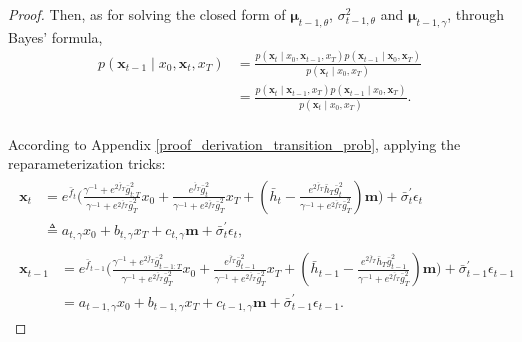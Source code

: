 \begin{proof}
Then, as for solving the closed form of $\boldsymbol{\mu}_{t-1, \theta}$, $\sigma_{t-1, \theta}^2$ and $\boldsymbol{\mu}_{t-1, \gamma}$, through Bayes' formula, 
\begin{equation}
\begin{aligned}
p\left( \mathbf{x}_{t-1}\mid x_0, \mathbf{x}_t, x_T \right)
&=\frac{p(\mathbf{x}_t \mid x_0, \mathbf{x}_{t-1}, x_T) p(\mathbf{x}_{t-1} \mid \mathbf{x}_0, \mathbf{x}_T)}{p(\mathbf{x}_t \mid x_0, x_T)} \\
&= \frac{p(\mathbf{x}_t \mid \mathbf{x}_{t-1}, x_T)p(\mathbf{x}_{t-1} \mid x_0, \mathbf{x}_T)}{p(\mathbf{x}_t \mid x_0, x_T)}.\\
\end{aligned}
\end{equation}

According to Appendix \ref{proof_derivation_transition_prob}, applying the reparameterization tricks:
\begin{equation}
\begin{gathered}
\begin{aligned}
\mathbf{x}_{t} &= e^{\bar{f}_{t}} \Bigg(\frac{\gamma^{-1} + e^{2\bar{f}_{T}} \bar{g}^2_{t:T}}{\gamma^{-1} + e^{2\bar{f}_{T}} \bar{g}^2_{T}} x_0 + \frac{e^{\bar{f}_{T}} \bar{g}^2_{t}}{\gamma^{-1} + e^{2\bar{f}_{T}} \bar{g}^2_{T}} x_T + \left(\bar{h}_{t} - \frac{e^{2\bar{f}_{T}} \bar{h}_{T} \bar{g}^2_{t}}{\gamma^{-1} + e^{2\bar{f}_{T}} \bar{g}^2_{T}}\right) \mathbf{m}\Bigg) + \bar{\sigma}_t^{\prime} \epsilon_{t}\\
& \triangleq a_{t, \gamma} x_0 + b_{t, \gamma} x_T + c_{t, \gamma} \mathbf{m} + \bar{\sigma}_t^{\prime} \epsilon_{t},
\end{aligned}\\
\begin{aligned}
\mathbf{x}_{t-1} &= e^{\bar{f}_{t-1}} \Bigg(\frac{\gamma^{-1} + e^{2\bar{f}_{T}} \bar{g}^2_{t-1:T}}{\gamma^{-1} + e^{2\bar{f}_{T}} \bar{g}^2_{T}} x_0 + \frac{e^{\bar{f}_{T}} \bar{g}^2_{t-1}}{\gamma^{-1} + e^{2\bar{f}_{T}} \bar{g}^2_{T}} x_T + \left(\bar{h}_{t-1} - \frac{e^{2\bar{f}_{T}} \bar{h}_{T} \bar{g}^2_{t-1}}{\gamma^{-1} + e^{2\bar{f}_{T}} \bar{g}^2_{T}}\right) \mathbf{m}\Bigg) + \bar{\sigma}_{t-1}^{\prime} \epsilon_{t-1}\\
&= a_{t-1, \gamma} x_0 + b_{t-1, \gamma} x_T + c_{t-1, \gamma} \mathbf{m} + \bar{\sigma}_{t-1}^{\prime} \epsilon_{t-1}.
\end{aligned}
\end{gathered}
\end{equation}


\end{proof}
